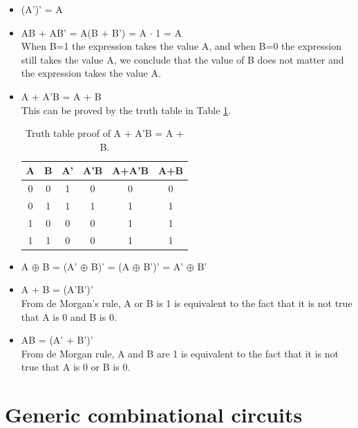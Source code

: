 \begin{itemize}
    \item (A')' = A
    \item AB + AB' = A(B + B') = A $\cdot$ 1 = A\\
    When B=1 the expression takes the value A, and when B=0 the expression still takes the value A, we conclude that the value of B does not matter and the expression takes the value A.
    \item A + A'B = A + B\\
    This can be proved by the truth table in Table \ref{tab:truth_table_proof}.
    \begin{table}[H]
  \begin{center}
    \caption{Truth table proof of A + A'B = A + B.}
    \label{tab:truth_table_proof}
    \begin{tabular}{|c|c||c|c|c||c|}
      \hline
      A& B&  A'& A'B& A+A'B& A+B   \\ \hline \hline
      0& 0&   1&   0&     0&   0   \\ \hline
      0& 1&   1&   1&     1&   1   \\ \hline
      1& 0&   0&   0&     1&   1   \\ \hline
      1& 1&   0&   0&     1&   1   \\ \hline
    \end{tabular}
  \end{center}
\end{table}
    \item A $\oplus$ B = (A' $\oplus$ B)' = (A $\oplus$ B')' = A' $\oplus$ B'
    \item A + B = (A'B')' \\
    From de Morgan's rule, A or B is 1 is equivalent to the fact that it is not true that A is 0 and B is 0.
    \item AB = (A' + B')'\\
    From de Morgan rule, A and B are 1 is equivalent to the fact that it is not true that A is 0 or B is 0.
\end{itemize}


\section{Generic combinational circuits}

